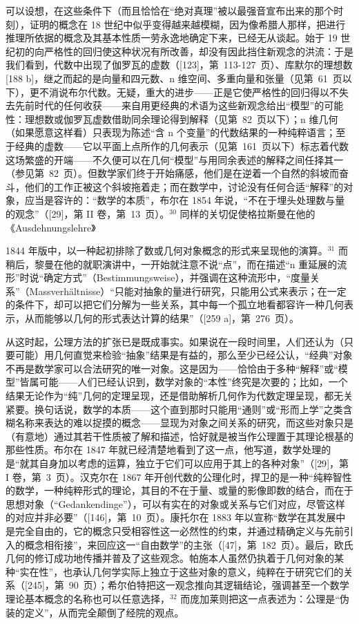 可以设想，在这些条件下（而且恰恰在“绝对真理”被以最强音宣布出来的那个时刻），证明的概念在 18 世纪中似乎变得越来越模糊，因为像希腊人那样，把进行推理所依据的概念及其基本性质一劳永逸地确定下来，已经无从谈起。始于 19 世纪初的向严格性的回归使这种状况有所改善，却没有因此挡住新观念的洪流：于是我们看到，代数中出现了伽罗瓦的虚数（{[}123{]}，第~113-127~页）、库默尔的理想数 {[}188 b{]}，继之而起的是向量和四元数、n 维空间、多重向量和张量（见第~61~页以下），更不消说布尔代数。无疑，重大的进步——正是它使严格性的回归得以不失去先前时代的任何收获——来自用更经典的术语为这些新观念给出“模型”的可能性：理想数或伽罗瓦虚数借助同余理论得到解释（见第~82~页以下）；n 维几何（如果愿意这样看）只表现为陈述“含 n 个变量”的代数结果的一种纯粹语言；至于经典的虚数——它以平面上点所作的几何表示（见第~161~页以下）标志着代数这场繁盛的开端——不久便可以在几何“模型”与用同余表述的解释之间任择其一（参见第~82~页）。但数学家们终于开始痛感，他们是在逆着一个自然的斜坡而奋斗，他们的工作正被这个斜坡拖着走；而在数学中，讨论没有任何合适“解释”的对象，应当是容许的：“数学的本质”，布尔在 1854 年说，“不在于埋头处理数与量的观念”（{[}29{]}，第 II 卷，第~13~页）。\(^{30}\) 同样的关切促使格拉斯曼在他的《Ausdehnungslehre》

1844 年版中，以一种起初排除了数或几何对象概念的形式来呈现他的演算。\(^{31}\) 而稍后，黎曼在他的就职演讲中，一开始就注意不说“点”，而在描述“n 重延展的流形”时说“确定方式”（Bestimmungsweise），并强调在这种流形中，“度量关系”（Massverhältnisse）“只能对抽象的量进行研究，只能用公式来表示；在一定的条件下，却可以把它们分解为一些关系，其中每一个孤立地看都容许一种几何表示，从而能够以几何的形式表达计算的结果”（{[}259 a{]}，第~276~页）。

从这时起，公理方法的扩张已是既成事实。如果说在一段时间里，人们还认为（只要可能）用几何直觉来检验“抽象”结果是有益的，那么至少已经公认，“经典”对象不再是数学家可以合法研究的唯一对象。这是因为——恰恰由于多种“解释”或“模型”皆属可能——人们已经认识到，数学对象的“本性”终究是次要的；比如，一个结果无论作为“纯”几何的定理呈现，还是借助解析几何作为代数定理呈现，都无关紧要。换句话说，数学的本质——这个直到那时只能用“通则”或“形而上学”之类含糊名称来表达的难以捉摸的概念——显现为对象之间关系的研究，而这些对象只是（有意地）通过其若干性质被了解和描述，恰好就是被当作公理置于其理论根基的那些性质。布尔在 1847 年就已经清楚地看到了这一点，他写道，数学处理的是“就其自身加以考虑的运算，独立于它们可以应用于其上的各种对象”（{[}29{]}，第 I 卷，第~3~页）。汉克尔在 1867 年开创代数的公理化时，捍卫的是一种“纯粹智性的数学，一种纯粹形式的理论，其目的不在于量、或量的影像即数的结合，而在于思想对象（“Gedankendinge”），可以有实在的对象或关系与它们对应，尽管这样的对应并非必要”（{[}146{]}，第~10~页）。康托尔在 1883 年以宣称“数学在其发展中是完全自由的，它的概念只受相容性这一必然性的约束，并通过精确定义与先前引入的概念相衔接”，来回应这一“自由数学”的主张（{[}47{]}，第~182~页）。最后，欧氏几何的修订成功地传播并普及了这些观念。帕施本人虽然仍执着于几何对象的某种“实在性”，也承认几何学实际上独立于这些对象的意义，纯粹在于研究它们的关系（{[}245{]}，第~90~页）；希尔伯特把这一观念推向其逻辑结论，强调甚至一个数学理论基本概念的名称也可以任意选择，\(^{32}\) 而庞加莱则把这一点表述为：公理是“伪装的定义”，从而完全颠倒了经院的观点。


